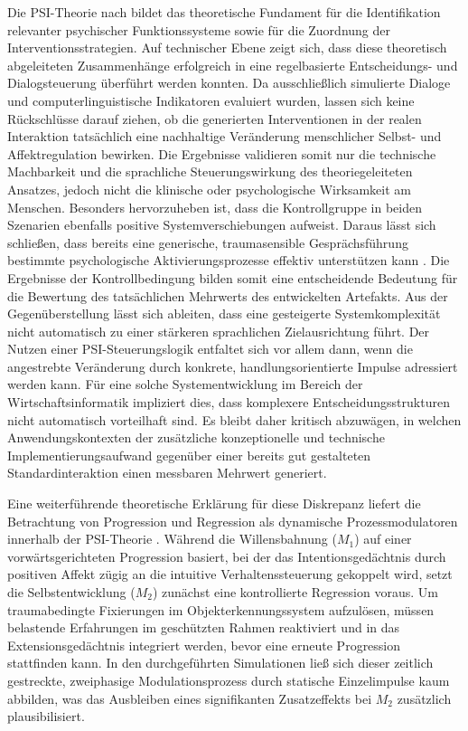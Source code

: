 Die PSI-Theorie nach \cite{Kuhl2000The} bildet das theoretische Fundament für die Identifikation relevanter psychischer Funktionssysteme sowie für die Zuordnung der Interventionsstrategien. Auf technischer Ebene zeigt sich, dass diese theoretisch abgeleiteten Zusammenhänge erfolgreich in eine regelbasierte Entscheidungs- und Dialogsteuerung  überführt werden konnten. Da ausschließlich simulierte Dialoge und computerlinguistische Indikatoren evaluiert wurden, lassen sich keine Rückschlüsse darauf ziehen, ob die generierten Interventionen in der realen Interaktion tatsächlich eine nachhaltige Veränderung menschlicher Selbst- und Affektregulation bewirken. Die Ergebnisse validieren somit nur die technische Machbarkeit und die sprachliche Steuerungswirkung des theoriegeleiteten Ansatzes, jedoch nicht die klinische oder psychologische Wirksamkeit am Menschen.
Besonders hervorzuheben ist, dass die Kontrollgruppe in beiden Szenarien ebenfalls positive Systemverschiebungen aufweist. Daraus lässt sich schließen, dass bereits eine generische, traumasensible Gesprächsführung bestimmte psychologische Aktivierungsprozesse effektiv unterstützen kann \citep{mai2023chatbots}. Die Ergebnisse der Kontrollbedingung bilden somit eine entscheidende Bedeutung für die Bewertung des tatsächlichen Mehrwerts des entwickelten Artefakts. Aus der Gegenüberstellung lässt sich ableiten, dass eine gesteigerte Systemkomplexität nicht automatisch zu einer stärkeren sprachlichen Zielausrichtung führt. Der Nutzen einer PSI-Steuerungslogik entfaltet sich vor allem dann, wenn die angestrebte Veränderung durch konkrete, handlungsorientierte Impulse adressiert werden kann. Für eine solche Systementwicklung im Bereich der Wirtschaftsinformatik impliziert dies, dass komplexere Entscheidungsstrukturen nicht automatisch vorteilhaft sind. Es bleibt daher kritisch abzuwägen, in welchen Anwendungskontexten der zusätzliche konzeptionelle und technische Implementierungsaufwand gegenüber einer bereits gut gestalteten Standardinteraktion einen messbaren Mehrwert generiert.

Eine weiterführende theoretische Erklärung für diese Diskrepanz liefert die Betrachtung von Progression und Regression als dynamische Prozessmodulatoren innerhalb der PSI-Theorie \citep{Kuhl2000The, kuhl2005neue}. Während die Willensbahnung ($M_1$) auf einer vorwärtsgerichteten Progression basiert, bei der das Intentionsgedächtnis durch positiven Affekt zügig an die intuitive Verhaltenssteuerung gekoppelt wird, setzt die Selbstentwicklung ($M_2$) zunächst eine kontrollierte Regression voraus. Um traumabedingte Fixierungen im Objekterkennungssystem aufzulösen, müssen belastende Erfahrungen im geschützten Rahmen reaktiviert und in das Extensionsgedächtnis integriert werden, bevor eine erneute Progression stattfinden kann. In den durchgeführten Simulationen ließ sich dieser zeitlich gestreckte, zweiphasige Modulationsprozess durch statische Einzelimpulse kaum abbilden, was das Ausbleiben eines signifikanten Zusatzeffekts bei $M_2$ zusätzlich plausibilisiert.

